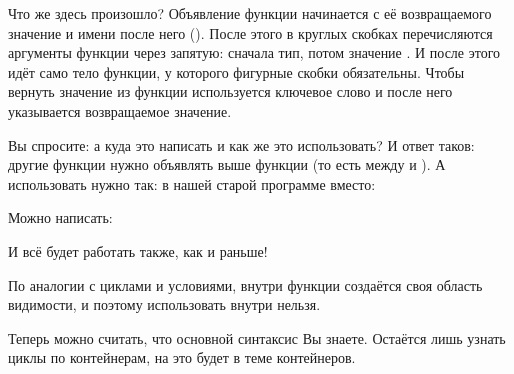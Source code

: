 
Что же здесь произошло? Объявление функции начинается с её возвращаемого значение и имени после него (). После этого в круглых скобках перечисляются аргументы функции через запятую: сначала тип, потом значение . И после этого идёт само тело функции, у которого фигурные скобки обязательны. Чтобы вернуть значение из функции используется ключевое слово  и после него указывается возвращаемое значение.

Вы спросите: а куда это написать и как же это использовать? И ответ таков: другие функции нужно объявлять выше функции  (то есть между  и ). А использовать нужно так: в нашей старой программе вместо:


Можно написать:


И всё будет работать также, как и раньше!

По аналогии с циклами и условиями, внутри функции создаётся своя область видимости, и поэтому использовать  внутри  нельзя.

Теперь можно считать, что основной синтаксис Вы знаете. Остаётся лишь узнать циклы по контейнерам, на это будет в теме контейнеров.

